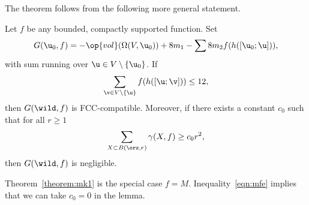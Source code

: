The theorem follows from the following more general statement.

\begin{lemma}\label{lemma:mk1}
  Let $f$ be any bounded, compactly supported function.  Set
\[
G( \u_0,f) = -\op{vol}(\Omega(V, \u_0)) + 8
m_1 - \sum 8 m_2 f(h([\u_0;\u])),
\]
with sum running over $\u\in V\setminus\{\u_0\}$.
If
\[  
\sum_{\v\in V\setminus\{\u\}} f(h([\u;\v])) \le 12,
\] 
then $G(\wild,f)$ is FCC-compatible.
Moreover, if there exists a constant $c_0$ such
that for all  $r\ge1$
\[
\sum_{X\subset B(\orz,r)} \gamma(X,f) \ge c_0 r^2,
\]
then $G(\wild,f)$ is negligible.
\end{lemma}

Theorem~\ref{theorem:mk1} is the special case $f=M$.  
Inequality~\ref{eqn:mfe} implies that we can take $c_0=0$ in the
lemma.

